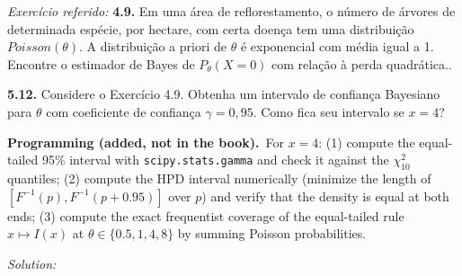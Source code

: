 \documentclass[11pt,a4paper]{article}
\newif\ifsolucoes
\newcommand{\espacoresol}{4.5cm}   %
\numberwithin{equation}{questao}   %
\newcommand{\programacao}{\par\smallskip\noindent\textbf{Programming (added, not in the book).}~}
\newcommand{\resolespaco}{\ifsolucoes\else\par\textit{Solution:}\vspace{\espacoresol}\par\fi}
\newcommand{\1}{\mathbf{1}}
\begin{document}
\begin{otherlanguage}{brazil}
\emph{Exercício referido:} \textbf{4.9.} Em uma área de reflorestamento, o número de árvores de
determinada espécie, por hectare, com certa doença tem uma distribuição $\mathit{Poisson}(\theta)$. A
distribuição a priori de $\theta$ é exponencial com média igual a 1. Encontre o estimador de Bayes
de $P_\theta(X=0)$ com relação à perda quadrática..

\textbf{5.12.} Considere o Exercício 4.9. Obtenha um intervalo de confiança Bayesiano para $\theta$
com coeficiente de confiança $\gamma=0,95$. Como fica seu intervalo se $x=4$?
\end{otherlanguage}
\programacao For $x=4$: (1) compute the equal-tailed 95\% interval with \texttt{scipy.stats.gamma}
and check it against the $\chi^2_{10}$ quantiles; (2) compute the HPD interval numerically (minimize
the length of $[F^{-1}(p),F^{-1}(p+0.95)]$ over $p$) and verify that the density is equal at both
ends; (3) compute the exact frequentist coverage of the equal-tailed rule $x\mapsto I(x)$ at
$\theta\in\{0.5,1,4,8\}$ by summing Poisson probabilities.
\resolespaco
\end{document}
